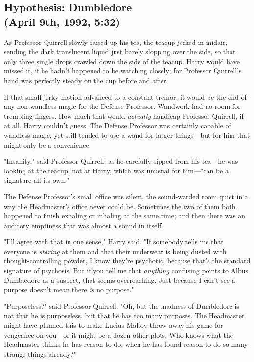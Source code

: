 \subsection{Hypothesis: Dumbledore\\
(April 9th, 1992, 5:32\PM)}

As Professor Quirrell slowly raised up his tea, the teacup jerked in midair,
sending the dark translucent liquid just barely slopping over the side, so that
only three single drops crawled down the side of the teacup. Harry would have
missed it, if he hadn't happened to be watching closely; for Professor
Quirrell's hand was perfectly steady on the cup before and after.

If that small jerky motion advanced to a constant tremor, it would be the end
of any non-wandless magic for the Defense Professor. Wandwork had no room for
trembling fingers. How much that would \emph{actually} handicap Professor
Quirrell, if at all, Harry couldn't guess. The Defense Professor was certainly
capable of wandless magic, yet still tended to use a wand for larger
things—but for him that might only be a convenience{\el}

"Insanity," said Professor Quirrell, as he carefully sipped from his tea—he
was looking at the teacup, not at Harry, which was unusual for him—"can be a
signature all its own."

The Defense Professor's small office was silent, the sound-warded room quiet in
a way the Headmaster's office never could be. Sometimes the two of them both
happened to finish exhaling or inhaling at the same time; and then there was an
auditory emptiness that was almost a sound in itself.

"I'll agree with that in one sense," Harry said. "If somebody tells me that
everyone is \emph{staring} at them and that their underwear is being dusted
with thought-controlling powder, I know they're psychotic, because that's the
standard signature of psychosis. But if you tell me that \emph{anything}
confusing points to Albus Dumbledore as a suspect, that seems{\el}
overreaching. Just because I can't see a purpose doesn't mean there \emph{is}
no purpose."

"Purposeless?" said Professor Quirrell. "Oh, but the madness of Dumbledore is
not that he is purposeless, but that he has too many purposes. The Headmaster
might have planned this to make Lucius Malfoy throw away his game for vengeance
on you—or it might be a dozen other plots. Who knows what the Headmaster
thinks he has reason to do, when he has found reason to do so many strange
things already?"

